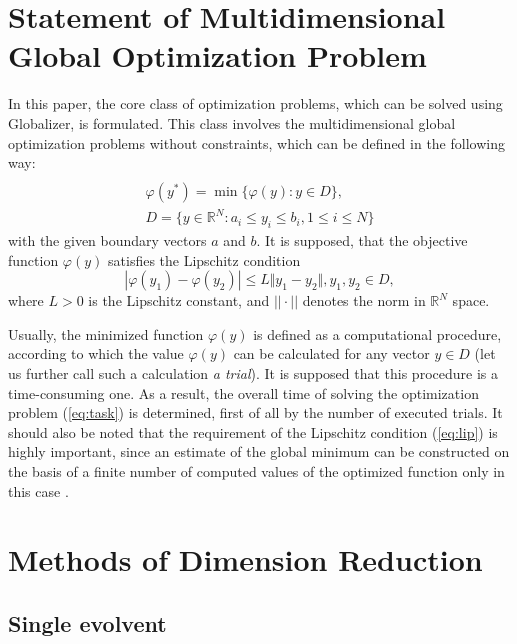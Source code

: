 \documentclass[runningheads]{llncs}
\begin{document}
\section{Statement of Multidimensional Global Optimization Problem}
In this paper, the core class of optimization problems, which can be solved using
Globalizer, is formulated. This class involves the multidimensional global
optimization problems without constraints, which can be defined in the following way:
\begin{equation}
\label{eq:task}
\begin{array}{cr}\\
  \varphi(y^*)=\min\{\varphi(y):y\in D\}, \\
  D=\{y\in \mathbb{R}^N:a_i\leq y_i\leq{b_i}, 1\leq{i}\leq{N}\}
\end{array}
\end{equation}
with the given boundary vectors  $a$ and  $b$. It is supposed, that the objective function
\(\varphi(y)\) satisfies the Lipschitz condition
\begin{equation}
\label{eq:lip}
|\varphi(y_1)-\varphi(y_2)|\leq L\Vert y_1-y_2\Vert,y_1,y_2\in D,
\end{equation}
where \(L>0\) is the Lipschitz constant, and \(||\cdot||\) denotes the norm in \(\mathbb{R}^N\)
space.
\par
Usually, the minimized function \(\varphi(y)\) is defined as a computational procedure,
according to which the value \(\varphi(y)\) can be calculated for any vector \(y\in D\)
(let us further call such a calculation \textit{a trial}). It is supposed that this procedure
is a time-consuming one. As a result, the overall time of solving the optimization
problem (\ref{eq:task}) is determined, first of all by the number of executed trials.
It should also be noted that the requirement of the Lipschitz condition (\ref{eq:lip})
is highly important, since an estimate of the global minimum can be constructed on the
basis of a finite number of computed values of the optimized function only in this case .

\section{Methods of Dimension Reduction}
\subsection{Single evolvent}
\end{document}
